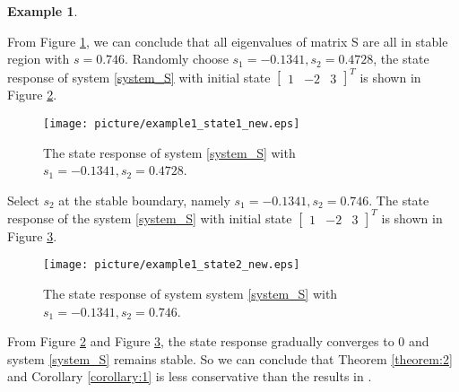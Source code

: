 \documentclass[]{interact}
\theoremstyle{plain}%
\theoremstyle{definition}
\newtheorem{example}[theorem]{Example}
\theoremstyle{remark}
\begin{document}
\begin{example}
\begin{figure}[H]
		\label{example1_poles} 
	\end{figure}
    \par  From Figure \ref{example1_poles}, we can conclude that all eigenvalues of matrix S are all in stable region with $s = 0.746$. Randomly choose $s_1=  -0.1341 ,s_2 =  0.4728$, the state response of system \eqref{system_S} with initial state $\begin{bmatrix}1 & -2 & 3\end{bmatrix}^T$ is shown in Figure \ref{example1_state1}. 
    \begin{figure}[H]
    	\centering
    	\texttt{[image: picture/example1\_state1\_new.eps]}
    	\caption{The state response of system \eqref{system_S} with $s_1=  -0.1341 ,s_2 =  0.4728$.} 
    	\label{example1_state1} 
    \end{figure}
    Select $s_2$ at the stable boundary, namely $s_1 = -0.1341,s_2 =  0.746$. The state response of the system \eqref{system_S} with initial state $\begin{bmatrix}1 & -2 & 3\end{bmatrix}^T$ is shown in Figure \ref{example1_state2}.
    \begin{figure}[H]
    	\centering
    	\texttt{[image: picture/example1\_state2\_new.eps]}
    	\caption{The state response of system system \eqref{system_S} with $s_1=  -0.1341,s_2 =  0.746$.} 
    	\label{example1_state2} 
    \end{figure}
    \par From Figure \ref{example1_state1} and Figure \ref{example1_state2}, the state response gradually converges to 0 and system \eqref{system_S} remains stable. So we can conclude that Theorem \ref{theorem:2} and Corollary \ref{corollary:1} is less conservative than the results in \cite{Chen2015}. 
\end{example}
\end{document}
